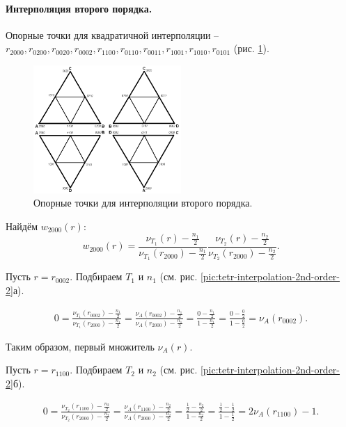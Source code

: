 \paragraph{Интерполяция второго порядка.} Опорные точки для квадратичной интерполяции -- $r_{2000}, r_{0200}, r_{0020}, r_{0002}, r_{1100}, r_{0110}, r_{0011}, r_{1001}, r_{1010}, r_{0101}$ (рис. \ref{pic:tetr-interpolation-2nd-order-1}).

\begin{figure}[h]
\centering
\includegraphics[width=0.5\textwidth]{png/tetr-interp-2nd-order-1.png}
\caption{Опорные точки для интерполяции второго порядка.}
\label{pic:tetr-interpolation-2nd-order-1}
\end{figure}


Найдём $w_{2000}(r)$:
\begin{equation}
w_{2000}(r) = \frac{ \nu_{T_1}(r) - \frac{n_1}{2} }{ \nu_{T_1}(r_{2000}) - \frac{n_1}{2} } \frac{ \nu_{T_2}(r) - \frac{n_2}{2} }{ \nu_{T_2}(r_{2000}) - \frac{n_2}{2} }.
\end{equation}


Пусть $r = r_{0002}$. Подбираем $T_1$ и $n_1$ (см. рис. \ref{pic:tetr-interpolation-2nd-order-2}а).

\begin{align}
0 = \frac{ \nu_{T_1}(r_{0002}) - \frac{n_1}{2} }{ \nu_{T_1}(r_{2000}) - \frac{n_1}{2} } = \frac{ \nu_{A}(r_{0002}) - \frac{n_1}{2} }{ \nu_{A}(r_{2000}) - \frac{n_1}{2} } = \frac{ 0 - \frac{n_1}{2} }{ 1 - \frac{n_1}{2} } = \frac{ 0 - \frac{0}{2} }{ 1 - \frac{0}{2} } = \nu_{A}(r_{0002}).
\end{align}

Таким образом, первый множитель $\nu_{A}(r)$.

Пусть $r = r_{1100}$. Подбираем $T_2$ и $n_2$ (см. рис. \ref{pic:tetr-interpolation-2nd-order-2}б).

\begin{align}
0 = \frac{ \nu_{T_2}(r_{1100}) - \frac{n_2}{2} }{ \nu_{T_2}(r_{2000}) - \frac{n_2}{2} } = \frac{ \nu_{A}(r_{1100}) - \frac{n_2}{2} }{ \nu_{A}(r_{2000}) - \frac{n_2}{2} } = \frac{ \frac{1}{2} - \frac{n_2}{2} }{ 1 - \frac{n_2}{2} } = \frac{ \frac{1}{2} - \frac{1}{2} }{ 1 - \frac{1}{2} } = 2\nu_{A}(r_{1100}) - 1.
\end{align}

